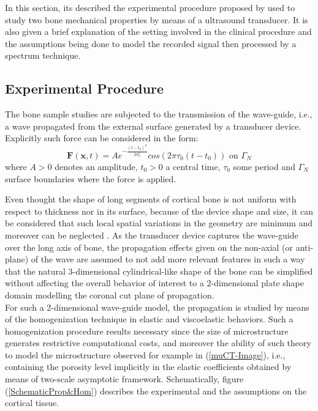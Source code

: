 In this section, its described the experimental procedure proposed by \cite{Minonzio2018} used to study two bone mechanical properties by means of a ultrasound transducer.
It is also given a brief explanation of the setting involved in the clinical procedure and the assumptions being done to model the recorded signal then processed by a spectrum technique. 

\subsection{Experimental Procedure}
The bone sample studies are subjected to the transmission of the wave-guide, i.e., a wave propagated from the external surface generated by a transducer device. 
Explicitly such force can be considered in the form:
\begin{equation*}
    \mathbf{F}(\mathbf{x},t) = A e^{-\frac{(t-t_0)^2}{2\sigma_0^2}} cos(2 \pi \tau_0 (t-t_0)) \text{ on } \Gamma_N
\end{equation*}
where $A > 0$ denotes an amplitude, $t_0 > 0$ a central time, $\tau_0$ some period and $\Gamma_N$ surface boundaries where the force is applied.

Even thought the shape of long segments of cortical bone is not uniform with respect to thickness nor in its surface, because of the device shape and size, it can be considered that such local spatial variations in the geometry are minimum and moreover can be neglected \cite{Foiret2014}. As the transducer device captures the wave-guide over the long axis of bone, the propagation effects given on the non-axial (or anti-plane) of the wave are assumed to not add more relevant features in such a way that the natural 3-dimensional cylindrical-like shape of the bone can be simplified without affecting the overall behavior of interest to a 2-dimensional plate shape domain modelling the coronal cut plane of propagation. \\

For such a 2-dimensional wave-guide model, the propagation is studied by means of the homogenization technique in elastic and viscoelastic behaviors. Such a homogenization procedure results necessary since the size of microstructure generates restrictive computational costs, and moreover the ability of such theory to model the microstructure observed for example in (\ref{muCT-Image}), i.e., containing the porosity level implicitly in the elastic coefficients obtained by means of two-scale asymptotic framework.  Schematically, figure (\ref{SchematicProp&Hom}) describes the experimental and the assumptions on the cortical tissue. \\

